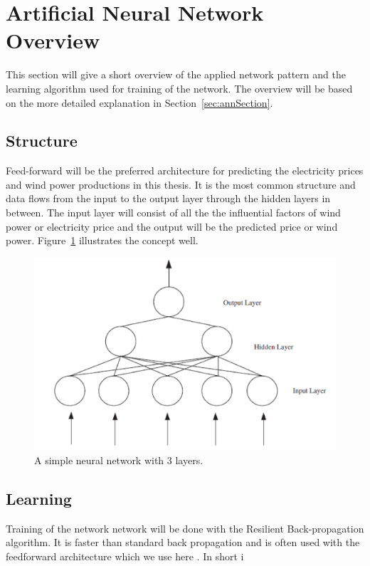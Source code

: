 \section{Artificial Neural Network Overview}
This section will give a short overview of the applied network pattern and the learning algorithm used for training of the network. The overview will be based on the more detailed explanation in Section~\ref{sec:annSection}.

\subsection{Structure}
Feed-forward will be the preferred architecture for predicting the electricity prices and wind power productions in this thesis. It is the most common structure and data flows from the input to the output layer through the hidden layers in between. The input layer will consist of all the the influential factors of wind power or electricity price and the output will be the predicted price or wind power. Figure~\ref{fig:overviewAnn} illustrates the concept well.

\begin{figure}[!ht]
\centering
\includegraphics[width=0.8\linewidth]{billeder/ANN.png}
\caption{A simple neural network with 3 layers. \cite{stockForecasting}}
\label{fig:overviewAnn}
\end{figure}

\subsection{Learning}
Training of the network network will be done with the Resilient Back-propagation algorithm. It is faster than standard back propagation \cite{8,15} and is often used with the feedforward architecture which we use here \cite{14,17}. In short i